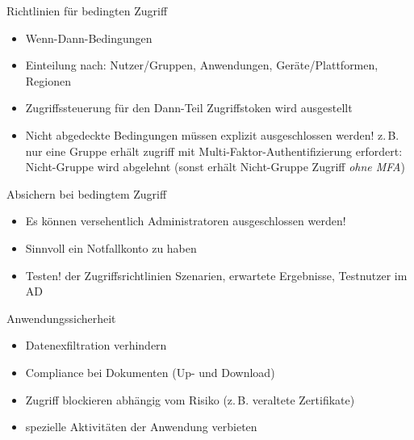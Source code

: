 \begin{flashcard}[Definition]{Richtlinien für bedingten Zugriff}
  \begin{itemize}
    \item Wenn-Dann-Bedingungen
    \item Einteilung nach:\newline
      Nutzer/Gruppen, Anwendungen, Geräte/Plattformen, Regionen
    \item Zugriffssteuerung für den Dann-Teil\newline
      Zugriffstoken wird ausgestellt
    \item Nicht abgedeckte Bedingungen müssen explizit ausgeschlossen werden!\newline
      z.\,B. nur eine Gruppe erhält zugriff mit Multi-Faktor-Authentifizierung erfordert:\newline
      Nicht-Gruppe wird abgelehnt (sonst erhält Nicht-Gruppe Zugriff \emph{ohne MFA})
  \end{itemize}
\end{flashcard}

\begin{flashcard}[Definition]{Absichern bei bedingtem Zugriff}
  \begin{itemize}
    \item Es können versehentlich Administratoren ausgeschlossen werden!
    \item Sinnvoll ein Notfallkonto zu haben
    \item Testen! der Zugriffsrichtlinien\newline
      Szenarien, erwartete Ergebnisse, Testnutzer im AD
  \end{itemize}
\end{flashcard}

\begin{flashcard}[Definition]{Anwendungssicherheit}
  \begin{itemize}
    \item Datenexfiltration verhindern
    \item Compliance bei Dokumenten (Up- und Download)
    \item Zugriff blockieren abhängig vom Risiko (z.\,B. veraltete Zertifikate)
    \item spezielle Aktivitäten der Anwendung verbieten
  \end{itemize}
\end{flashcard}

